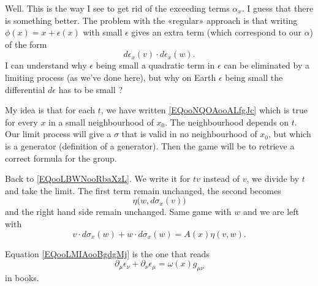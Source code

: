 \begin{probleme}
    Well. This is the way I see to get rid of the exceeding terms \( \alpha_x\). I guess that there is something better. The problem with the «regular» approach is that writing \( \phi(x)=x+\epsilon(x)\) with small \( \epsilon\) gives an extra term (which correspond to our \( \alpha\)) of the form
    \begin{equation}
        d\epsilon_x(v)\cdot d\epsilon_x(w).
    \end{equation}
    I can understand why \( \epsilon\) being small a quadratic term in \( \epsilon\) can be eliminated by a limiting process (as we've done here), but why on Earth \( \epsilon\) being small the differential \( d\epsilon\) has to be small ?

    My idea is that for each \( t\), we have written \eqref{EQooNQOAooALfgJc} which is true for every \( x\) in a small neighbourhood of \( x_0\). The neighbourhood depends on \( t\). Our limit process will give a \( \sigma\) that is valid in no neighbourhood of \( x_0\), but which is a generator (definition of a generator). Then the game will be to retrieve a correct formula for the group.
\end{probleme}

Back to \eqref{EQooLBWNooRbaXzL}. We write it for \( tv\) instead of \( v\), we divide by \( t\) and take the limit. The first term remain unchanged, the second becomes 
\begin{equation}
    \eta\big( w,d\sigma_x(v) \big)
\end{equation}
and the right hand side remain unchanged. Same game with \( w\) and we are left with
\begin{equation}        \label{EQooLMIAooBgdgMj}
    v\cdot d\sigma_x(w)+w\cdot d\sigma_x(w)=A(x)\eta(v,w).
\end{equation}

\begin{remark}
    Equation \eqref{EQooLMIAooBgdgMj} is the one that reads
    \begin{equation}
        \partial_{\mu}\epsilon_{\nu}+\partial_{\nu}\epsilon_{\mu}=\omega(x)g_{\mu\nu}
    \end{equation}
    in books.
\end{remark}
